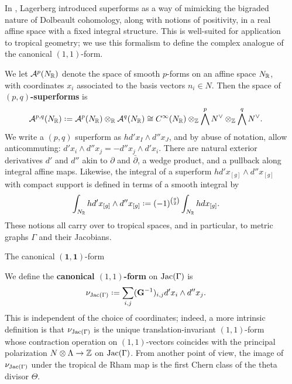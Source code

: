 \documentclass[final]{beamer}
\newcommand*{\defn}[1]{\textbf{#1}}
\newlength{\sepwidth}
\newlength{\colwidth}
\newcommand{\separatorcolumn}{\begin{column}{\sepwidth}\end{column}}
\begin{document}
\begin{frame}[t]
\begin{columns}[t]
\separatorcolumn

\begin{column}{\colwidth}

\begin{block*}
In \cite{lagerberg2012super}, Lagerberg introduced superforms as a way of mimicking the bigraded nature of Dolbeault cohomology, along with notions of positivity, in a real affine space with a fixed integral structure.  This is well-suited for application to tropical geometry; we use this formalism to define the complex analogue of the canonical $(1,1)$-form.

We let $\mathcal{A}^{p}(N_{\mathbb{R}})$ denote the space of smooth $p$-forms on an affine space $N_{\mathbb{R}}$, with coordinates $x_{i}$ associated to the basis vectors $n_{i} \in N$.  Then the space of \defn{$(p,q)$-superforms} is 
\begin{equation}
  \Cd^{p,q}(N_{\RR}) \defeq \cA^{p}(N_{\RR}) \otimes_{\RR} \cA^{q}(N_{\RR}) \cong C^{\infty}(N_{\RR}) \otimes_{\ZZ} \bigwedge^{p}N^{\vee} \otimes_{\ZZ} \bigwedge^{q}N^{\vee}.
\end{equation}
We write a $(p,q)$ superform as $h d'x_{I} \wedge d''x_{J}$, and by abuse of notation, allow anticommuting: $d'x_{i} \wedge d''x_{j} = -d''x_{j} \wedge d'x_{i}$.  There are natural exterior derivatives $d'$ and $d''$ akin to $\partial$ and $\bar\partial$, a wedge product, and a pullback along integral affine maps.  Likewise, the integral of a superform $h d'x_{[g]} \wedge d''x_{[g]}$ with compact support is defined in terms of a smooth integral by
\begin{equation}
  \int_{N_{\RR}} h d'x_{[g]} \wedge d''x_{[g]} \defeq (-1)^{\binom{g}{2}} \int_{N_{\RR}} h dx_{[g]}.
\end{equation}
These notions all carry over to tropical spaces, and in particular, to metric graphs $\Gamma$ and their Jacobians.
\end{block*}

\begin{block}{The canonical $\mathbf{(1,1)}$-form}

We define the \defn{canonical $(1,1)$-form} on $\operatorname{Jac}(\Gamma)$ is 
\begin{equation}
  \nu_{\Jac(\Gamma)} \defeq \sum_{i,j} (\mathbf{G}^{-1})_{i,j} d'x_{i} \wedge d''x_{j}.
\end{equation}
This is independent of the choice of coordinates; indeed, a more intrinsic definition is that $\nu_{\operatorname{Jac}(\Gamma)}$ is the unique translation-invariant $(1,1)$-form whose contraction operation on $(1,1)$-vectors coincides with the principal polarization $N \otimes \Lambda \to \mathbb{Z}$ on $\operatorname{Jac}(\Gamma)$.  From another point of view, the image of $\nu_{\operatorname{Jac}(\Gamma)}$ under the tropical de Rham map is the first Chern class of the theta divisor $\Theta$.


\end{block}
\end{column}
\end{columns}
\end{frame}
\end{document}
